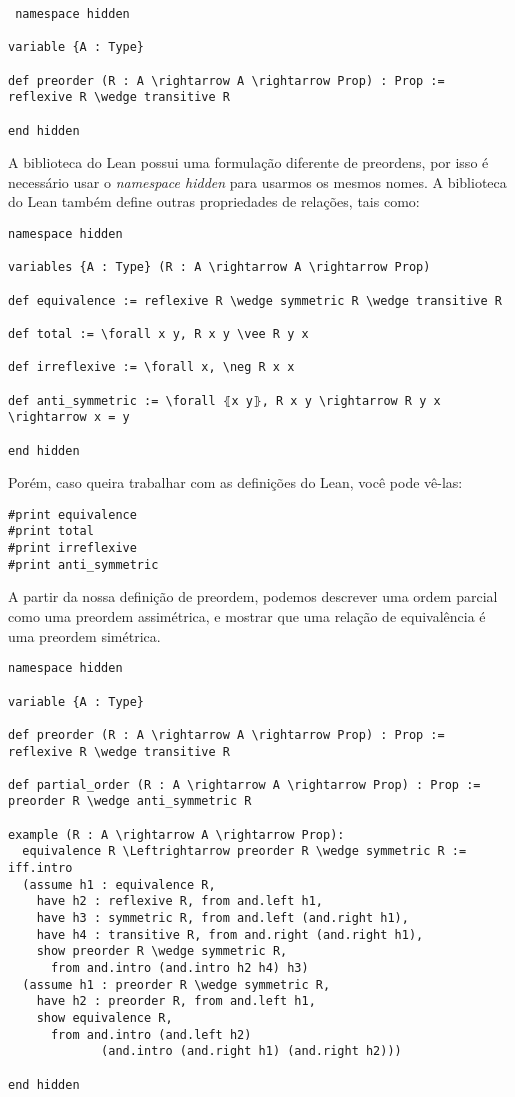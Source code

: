  \begin{lstlisting}
 namespace hidden

variable {A : Type}

def preorder (R : A \rightarrow A \rightarrow Prop) : Prop :=
reflexive R \wedge transitive R

end hidden
 \end{lstlisting}
A biblioteca do Lean possui uma formulação diferente de preordens, por isso é necessário usar o \textit{namespace hidden} para usarmos os mesmos nomes. A biblioteca do Lean também define outras propriedades de relações, tais como:

\begin{lstlisting}
namespace hidden

variables {A : Type} (R : A \rightarrow A \rightarrow Prop)

def equivalence := reflexive R \wedge symmetric R \wedge transitive R

def total := \forall x y, R x y \vee R y x

def irreflexive := \forall x, \neg R x x

def anti_symmetric := \forall ⦃x y⦄, R x y \rightarrow R y x \rightarrow x = y

end hidden
\end{lstlisting}
 
 Porém, caso queira trabalhar com as definições do Lean, você pode vê-las:
 \begin{lstlisting}
#print equivalence
#print total
#print irreflexive
#print anti_symmetric
 \end{lstlisting}

A partir da nossa definição de preordem, podemos descrever uma ordem parcial como uma preordem assimétrica, e mostrar que uma relação de equivalência é uma preordem simétrica.
\begin{lstlisting}
namespace hidden

variable {A : Type}

def preorder (R : A \rightarrow A \rightarrow Prop) : Prop :=
reflexive R \wedge transitive R

def partial_order (R : A \rightarrow A \rightarrow Prop) : Prop :=
preorder R \wedge anti_symmetric R

example (R : A \rightarrow A \rightarrow Prop):
  equivalence R \Leftrightarrow preorder R \wedge symmetric R :=
iff.intro
  (assume h1 : equivalence R,
    have h2 : reflexive R, from and.left h1,
    have h3 : symmetric R, from and.left (and.right h1),
    have h4 : transitive R, from and.right (and.right h1),
    show preorder R \wedge symmetric R,
      from and.intro (and.intro h2 h4) h3)
  (assume h1 : preorder R \wedge symmetric R,
    have h2 : preorder R, from and.left h1,
    show equivalence R,
      from and.intro (and.left h2)
             (and.intro (and.right h1) (and.right h2)))

end hidden

\end{lstlisting}

